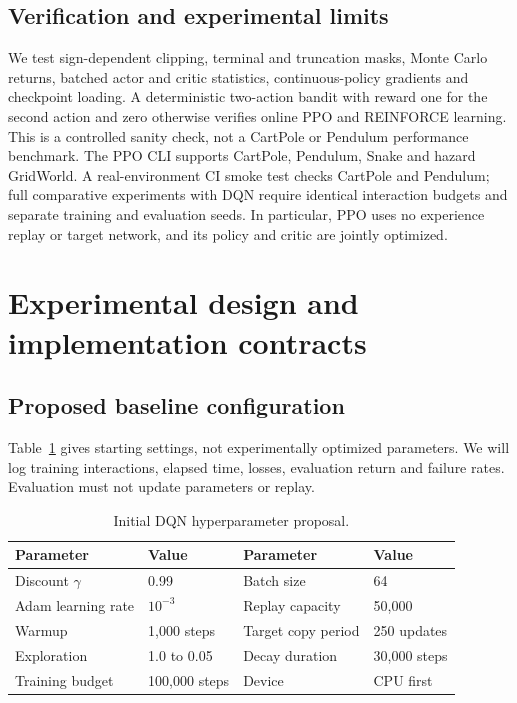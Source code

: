 \documentclass[11pt,a4paper]{article}
\begin{document}
\subsection{Verification and experimental limits}
We test sign-dependent clipping, terminal and truncation masks, Monte Carlo
returns, batched actor and critic statistics, continuous-policy gradients and
checkpoint loading. A deterministic two-action bandit with reward one for the
second action and zero otherwise verifies online PPO and REINFORCE learning.
This is a controlled sanity check, not a CartPole or Pendulum performance
benchmark. The PPO CLI supports CartPole, Pendulum, Snake and hazard GridWorld.
A real-environment CI smoke test checks CartPole and Pendulum; full comparative
experiments with DQN require identical interaction budgets and separate training
and evaluation seeds. In particular, PPO uses no experience replay or target
network, and its policy and critic are jointly optimized.

\section{Experimental design and implementation contracts}
\subsection{Proposed baseline configuration}
Table~\ref{tab:params} gives starting settings, not experimentally optimized parameters. We will log training interactions, elapsed time, losses, evaluation return and failure rates. Evaluation must not update parameters or replay.
\begin{table}[ht]
\centering
\caption{Initial DQN hyperparameter proposal.}\label{tab:params}
\begin{tabular}{ll@{\quad}ll}
\toprule
Parameter & Value & Parameter & Value\\
\midrule
Discount $\gamma$ & 0.99 & Batch size & 64\\
Adam learning rate & $10^{-3}$ & Replay capacity & 50,000\\
Warmup & 1,000 steps & Target copy period & 250 updates\\
Exploration & 1.0 to 0.05 & Decay duration & 30,000 steps\\
Training budget & 100,000 steps & Device & CPU first\\
\bottomrule
\end{tabular}
\end{table}
\end{document}
